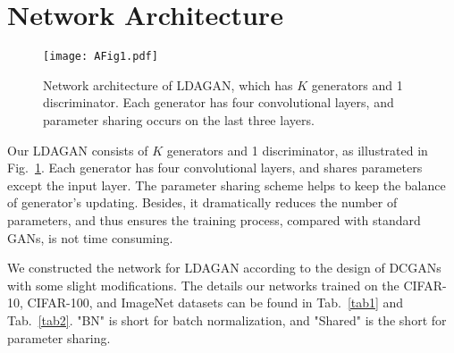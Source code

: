 \documentclass{article}
\begin{document}
\section{Network Architecture}
\label{App:NetArch}

\begin{figure}
  \centering
    \texttt{[image: AFig1.pdf]}
     \caption{Network architecture of LDAGAN, which has $K$ generators and 1 discriminator. Each generator has four convolutional layers, and parameter sharing occurs on the last three layers.}
     \label{fig:Synth}
\end{figure}

Our LDAGAN consists of $K$ generators and 1 discriminator, as illustrated in Fig.~\ref{fig:Synth}.
Each generator has four convolutional layers, and shares parameters except the input layer.
The parameter sharing scheme helps to keep the balance of generator's updating.
Besides, it dramatically reduces the number of parameters, and thus ensures the training process, compared with standard GANs, is not time consuming.


We constructed the network for LDAGAN according to the design of DCGANs~\cite{radford2015unsupervised} with some slight modifications.
The details our networks trained on the CIFAR-10, CIFAR-100, and ImageNet datasets can be found in Tab.~\ref{tab1} and Tab.~\ref{tab2}.
"BN" is short for batch normalization, and "Shared" is the short for parameter sharing.
\end{document}

